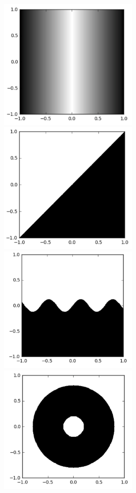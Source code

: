 \documentclass[letterpaper,11pt]{amsart}
\theoremstyle{plain}
\theoremstyle{definition}
\begin{document}
\noindent\includegraphics[width=2.7in]{img1.png}
\noindent\includegraphics[width=2.7in]{img2.png}\\
\noindent\includegraphics[width=2.7in]{img3.png}
\noindent\includegraphics[width=2.7in]{img4.png}\\
\end{document}

